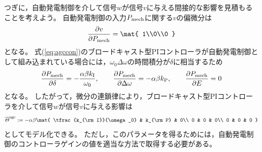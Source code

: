 \documentclass[tombow,dvipdfmx]{corona-a5-1.1}
\begin{document}
つぎに，自動発電制御を介して信号$w$が信号$v$に与える間接的な影響を見積もることを考えよう。
自動発電制御の入力$P_{\rm mech}$に関する$v$の偏微分は
\[
\frac{\partial v}{\partial P_{\rm mech}}
=
\mat{
1\\0\\0
}
\]
となる。
式(\ref{eq:agccon})のブロードキャスト型PIコントローラが自動発電制御として組み込まれている場合には，$\omega_0 \Delta \omega$の時間積分が$\delta$に相当するため
\[
\frac{\partial P_{\rm mech}}{\partial \delta} = -  \frac{\alpha \beta k_{\rm I}}{\omega_0} 
,\qquad
\frac{\partial P_{\rm mech}}{\partial \Delta \omega}= - \alpha \beta k_{\rm P}
,\qquad
\frac{\partial P_{\rm mech}}{\partial E}= 0
\]
となる。
したがって，微分の連鎖律により，ブロードキャスト型PIコントローラを介して信号$w$が信号$v$に与える影響は
\begin{align}
\overline{\mathit{\Theta}}^{\rm agc}:=
-  \alpha \beta \mat{
\tfrac{k_{\rm I}}{\omega_0} & k_{\rm P}  & 0\\
0 & 0 & 0\\
0 & 0 & 0
}
\end{align}
としてモデル化できる。
ただし，このパラメータを得るためには，自動発電制御のコントローラゲインの値を適当な方法で取得する必要がある。
\end{document}
